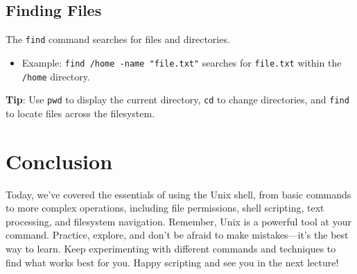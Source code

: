 \documentclass[12pt]{article}
\begin{document}
\subsection{Finding Files}
The \texttt{find} command searches for files and directories.
\begin{itemize}
    \item Example: \texttt{find /home -name "file.txt"} searches for \texttt{file.txt} within the \texttt{/home} directory.
\end{itemize}

\noindent \textbf{Tip}: Use \texttt{pwd} to display the current directory, \texttt{cd} to change directories, and \texttt{find} to locate files across the filesystem.

\section{Conclusion}

Today, we've covered the essentials of using the Unix shell, from basic commands to more complex operations, including file permissions, shell scripting, text processing, and filesystem navigation. Remember, Unix is a powerful tool at your command. Practice, explore, and don't be afraid to make mistakes—it's the best way to learn. Keep experimenting with different commands and techniques to find what works best for you. Happy scripting and see you in the next lecture!
\end{document}
